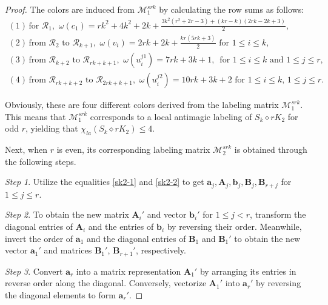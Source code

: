 \documentclass[12pt]{article}
\begin{document}
\begin{proof}
The colors are induced from $\boldsymbol{\mathcal{M}}_{1}^{srk}$ by calculating the row sums as follows:
\begin{equation*}
\begin{array}{l}
(1)\,\text{for $\mathcal{R}_{1}$},\,\,\omega(c_{1})=rk^{2}+4k^{2}+2k+\frac{3k^{2}(r^{2}+2r-3)+(kr-k)(2rk-2k+3)}{2},\\[6pt]
(2)\,\text{from $\mathcal{R}_{2}$ to $\mathcal{R}_{k+1}$},\,\,\omega(v_{i})=2rk+2k+\frac{kr(5rk+3)}{2}\text{ for $1\leq i\leq k$},\\[6pt]
(3)\,\text{from $\mathcal{R}_{k+2}$ to $\mathcal{R}_{rk+k+1}$},\,\,\omega(u_{i}^{j1})=7rk+3k+1,\,\text{ for $1\leq i\leq k$ and $1\leq j\leq r$},\\[6pt]
(4)\,\text{from $\mathcal{R}_{rk+k+2}$ to $\mathcal{R}_{2rk+k+1}$},\,\,\omega(u_{i}^{j2})=10rk+3k+2\text{ for $1\leq i\leq k$, $1\leq j\leq r$}.
\end{array}
\end{equation*}

Obviously, these are four different colors derived from the labeling matrix $\boldsymbol{\mathcal{M}}_{1}^{srk}$. This means that $\boldsymbol{\mathcal{M}}_{1}^{srk}$ corresponds to a local antimagic labeling of $S_{k}\diamond rK_{2}$ for odd $r$, yielding that $\chi_{la}(S_{k}\diamond rK_{2})\leq 4$.

Next, when $r$ is even, its corresponding labeling matrix $\boldsymbol{\mathcal{M}}_{2}^{srk}$ is obtained through the following steps.

{\it Step 1}. Utilize the equalities \eqref{sk2-1} and \eqref{sk2-2} to get $\boldsymbol{a}_{j},\boldsymbol{A}_{j},\boldsymbol{b}_{j},\boldsymbol{B}_{j},\boldsymbol{B}_{r+j}$ for $1\leq j\leq r$.

{\it Step 2}. To obtain the new matrix $\boldsymbol{A}_{i}'$ and vector $\boldsymbol{b}_{i}'$ for $1\leq j< r$, transform the diagonal entries of  $\boldsymbol{A}_{i}$ and the entries of $\boldsymbol{b}_{i}$ by reversing their order. Meanwhile, invert the order of $\boldsymbol{a}_{1}$ and the diagonal entries of $\boldsymbol{B}_{1}$ and $\boldsymbol{B}_{1}'$ to obtain the new vector $\boldsymbol{a}_{1}'$ and matrices $\boldsymbol{B}_{1}'$, $\boldsymbol{B}_{r+1}'$, respectively.

{\it Step 3}. Convert $\boldsymbol{a}_{r}$ into a matrix representation $\boldsymbol{A}_{1}'$ by arranging its entries in reverse order along the diagonal. Conversely, vectorize $\boldsymbol{A}_{1}'$ into $\boldsymbol{a}_{r}'$ by reversing the diagonal elements to form $\boldsymbol{a}_{r}'$.


\end{proof}
\end{document}
